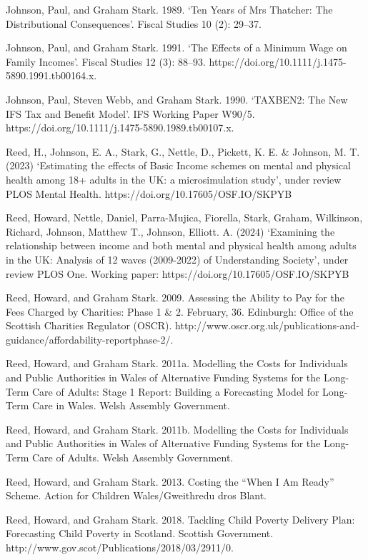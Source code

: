 \documentclass[
  letterpaper,
  DIV=11,
  numbers=noendperiod]{scrartcl}
\begin{document}
Johnson, Paul, and Graham Stark. 1989. `Ten Years of Mrs Thatcher: The
Distributional Consequences'. Fiscal Studies 10 (2): 29--37.

Johnson, Paul, and Graham Stark. 1991. `The Effects of a Minimum Wage on
Family Incomes'. Fiscal Studies 12 (3): 88--93.
https://doi.org/10.1111/j.1475-5890.1991.tb00164.x.

Johnson, Paul, Steven Webb, and Graham Stark. 1990. `TAXBEN2: The New
IFS Tax and Benefit Model'. IFS Working Paper W90/5.
https://doi.org/10.1111/j.1475-5890.1989.tb00107.x.

Reed, H., Johnson, E. A., Stark, G., Nettle, D., Pickett, K. E. \&
Johnson, M. T. (2023) `Estimating the effects of Basic Income schemes on
mental and physical health among 18+ adults in the UK: a microsimulation
study', under review PLOS Mental Health.
https://doi.org/10.17605/OSF.IO/SKPYB

Reed, Howard, Nettle, Daniel, Parra-Mujica, Fiorella, Stark, Graham,
Wilkinson, Richard, Johnson, Matthew T., Johnson, Elliott. A. (2024)
`Examining the relationship between income and both mental and physical
health among adults in the UK: Analysis of 12 waves (2009-2022) of
Understanding Society', under review PLOS One. Working paper:
https://doi.org/10.17605/OSF.IO/SKPYB

Reed, Howard, and Graham Stark. 2009. Assessing the Ability to Pay for
the Fees Charged by Charities: Phase 1 \& 2. February, 36. Edinburgh:
Office of the Scottish Charities Regulator (OSCR).
http://www.oscr.org.uk/publications-and-guidance/affordability-reportphase-2/.

Reed, Howard, and Graham Stark. 2011a. Modelling the Costs for
Individuals and Public Authorities in Wales of Alternative Funding
Systems for the Long-Term Care of Adults: Stage 1 Report: Building a
Forecasting Model for Long-Term Care in Wales. Welsh Assembly
Government.

Reed, Howard, and Graham Stark. 2011b. Modelling the Costs for
Individuals and Public Authorities in Wales of Alternative Funding
Systems for the Long-Term Care of Adults. Welsh Assembly Government.

Reed, Howard, and Graham Stark. 2013. Costing the ``When I Am Ready''
Scheme. Action for Children Wales/Gweithredu dros Blant.

Reed, Howard, and Graham Stark. 2018. Tackling Child Poverty Delivery
Plan: Forecasting Child Poverty in Scotland. Scottish Government.
http://www.gov.scot/Publications/2018/03/2911/0.
\end{document}
